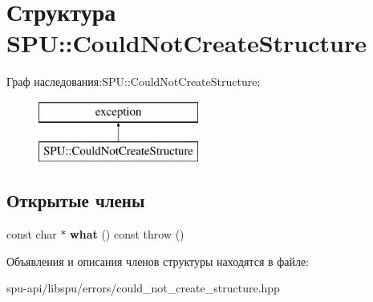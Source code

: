 \hypertarget{struct_s_p_u_1_1_could_not_create_structure}{}\section{Структура S\+PU\+:\+:Could\+Not\+Create\+Structure}
\label{struct_s_p_u_1_1_could_not_create_structure}
Граф наследования\+:S\+PU\+:\+:Could\+Not\+Create\+Structure\+:\begin{figure}[H]
\begin{center}
\leavevmode
\includegraphics[height=2.000000cm]{struct_s_p_u_1_1_could_not_create_structure}
\end{center}
\end{figure}
\subsection*{Открытые члены}
\begin{DoxyCompactItemize}
\item 
\mbox{\label{struct_s_p_u_1_1_could_not_create_structure_a7edb5a77f07de1db2b7e16f9370bb5f8}} 
const char $\ast$ {\bfseries what} () const  throw ()
\end{DoxyCompactItemize}


Объявления и описания членов структуры находятся в файле\+:\begin{DoxyCompactItemize}
\item 
spu-\/api/libspu/errors/could\+\_\+not\+\_\+create\+\_\+structure.\+hpp\end{DoxyCompactItemize}
